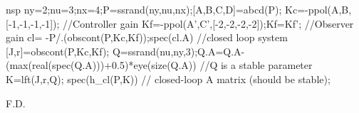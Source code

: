 \begin{examples}
  \begin{mintednsp}{nsp}
    ny=2;nu=3;nx=4;P=ssrand(ny,nu,nx);[A,B,C,D]=abcd(P);
    Kc=-ppol(A,B,[-1,-1,-1,-1]);  //Controller gain
    Kf=-ppol(A',C',[-2,-2,-2,-2]);Kf=Kf';    //Observer gain
    cl= -P/.(obscont(P,Kc,Kf));spec(cl.A)   //closed loop system
    [J,r]=obscont(P,Kc,Kf);
    Q=ssrand(nu,ny,3);Q.A=Q.A-(max(real(spec(Q.A)))+0.5)*eye(size(Q.A))
    //Q is a stable parameter
    K=lft(J,r,Q);
    spec(h_cl(P,K))  // closed-loop A matrix (should be stable);
  \end{mintednsp}
\end{examples}
\begin{manseealso}
            
\end{manseealso}
\begin{authors}
  F.D.
\end{authors}
